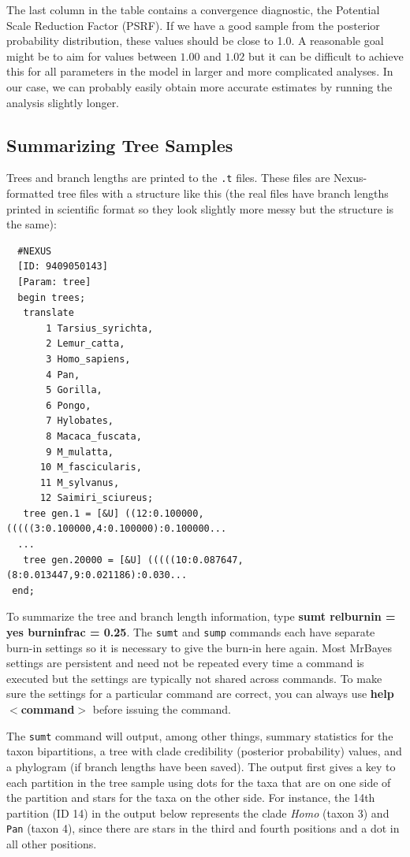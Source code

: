 \documentclass[12pt]{book}
\begin{document}
The last column in the table contains a convergence diagnostic, the Potential Scale Reduction Factor (PSRF). 
If we have a good sample from the posterior probability distribution, these values should be close to 1.0. A 
reasonable goal might be to aim for values between $1.00$ and $1.02$ but it can be difficult to achieve this 
for all parameters in the model in larger and more complicated analyses. In our case, we can probably easily 
obtain more accurate estimates by running the analysis slightly longer.

\subsection{Summarizing Tree Samples}

Trees and branch lengths are printed to the \texttt{.t} files. These files are Nexus-formatted tree files 
with a structure like this (the real files have branch lengths printed in scientific format so they look 
slightly more messy but the structure is the same):

\begin{singlespacing}
\small
\begin{verbatim}
  #NEXUS
  [ID: 9409050143]
  [Param: tree]
  begin trees;
   translate
       1 Tarsius_syrichta,
       2 Lemur_catta,
       3 Homo_sapiens,
       4 Pan,
       5 Gorilla,
       6 Pongo,
       7 Hylobates,
       8 Macaca_fuscata,
       9 M_mulatta,
      10 M_fascicularis,
      11 M_sylvanus,
      12 Saimiri_sciureus;
   tree gen.1 = [&U] ((12:0.100000,(((((3:0.100000,4:0.100000):0.100000...
  ...
   tree gen.20000 = [&U] (((((10:0.087647,(8:0.013447,9:0.021186):0.030...
 end;
\end{verbatim}
\normalsize
\end{singlespacing}

To summarize the tree and branch length information, type \textbf{sumt relburnin = yes burninfrac = 0.25}. 
The \texttt{sumt} and \texttt{sump} commands each have separate burn-in settings so it is necessary to give 
the burn-in here again. Most MrBayes settings are persistent and need not be repeated every time a command 
is executed but the settings are typically not shared across commands. To make sure the settings for a 
particular command are correct, you can always use \textbf{help $<$command$>$} before issuing the command.

The \texttt{sumt} command will output, among other things, summary statistics for the taxon bipartitions, a 
tree with clade credibility (posterior probability) values, and a phylogram (if branch lengths have been 
saved). The output first gives a key to each partition in the tree sample using dots for the taxa that are 
on one side of the partition and stars for the taxa on the other side. For instance, the 14th partition (ID 
14) in the output below represents the clade \textit{Homo} (taxon 3) and \texttt{Pan} (taxon 4), since there 
are stars in the third and fourth positions and a dot in all other positions.
\end{document}
